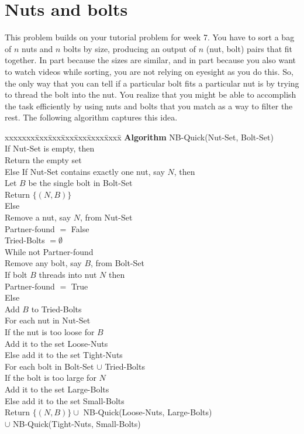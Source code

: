 \documentclass[11pt]{article}
\begin{document}
\section{Nuts and bolts}
\label{sec-4}
This problem builds on your tutorial problem for week 7. 
You have to sort a bag of $n$ nuts and $n$ bolts by size, producing an
output of $n$ (nut, bolt) pairs that fit together.  In part because
the sizes are similar, and in part because you also want to watch
videos while sorting, you are not relying on eyesight as you do
this. So, the only way that you can tell if a particular bolt fits a
particular nut is by trying to thread the bolt into the nut.  
You realize that you might be able to accomplish the task
efficiently by using nuts and bolts that you match as a way to
filter the rest. The following algorithm captures this idea.

\begin{tabbing}
xxxxxxx\=xxx\=xxx\=xxx\=xxx\=xxxx\=xxxx\= \kill
\> {\bf Algorithm} NB-Quick(Nut-Set, Bolt-Set) \\
\>\> If Nut-Set is empty, then \\
\>\>\>   Return the empty set \\
\>\> Else If Nut-Set contains exactly one nut, say $N$, then \\
\>\>\>   Let $B$ be the single bolt in Bolt-Set \\
\>\>\>   Return $\{ (N,B) \}$ \\
\>\> Else \\
\>\>\>   Remove a nut, say $N$, from Nut-Set \\
\>\>\>   Partner-found $=$ False \\
\>\>\>   Tried-Bolts $= \emptyset$ \\
\>\>\>   While not Partner-found \\
\>\>\>\>    Remove any bolt, say $B$, from Bolt-Set \\
\>\>\>\>    If bolt $B$ threads into nut $N$ then \\
\>\>\>\>\>    Partner-found $=$ True \\
\>\>\>\>    Else \\
\>\>\>\>\>     Add $B$ to Tried-Bolts         \\
\>\>\>   For each nut in Nut-Set\\
\>\>\>\>    If the nut is too loose for $B$\\
\>\>\>\>\>    Add it to the set Loose-Nuts\\
\>\>\>\>  Else add it to the set Tight-Nuts\\
\>\>\>   For each bolt in Bolt-Set $\cup$ Tried-Bolts\\
\>\>\>\>    If the bolt is too large for $N$\\
\>\>\>\>\>    Add it to the set Large-Bolts\\
\>\>\>\>  Else add it to the set Small-Bolts\\
\>\>\> Return $\{ (N,B) \} \cup$ NB-Quick(Loose-Nuts, Large-Bolts)\\
\>\>\> $\cup$ NB-Quick(Tight-Nuts, Small-Bolts)
\end{tabbing}
\end{document}
